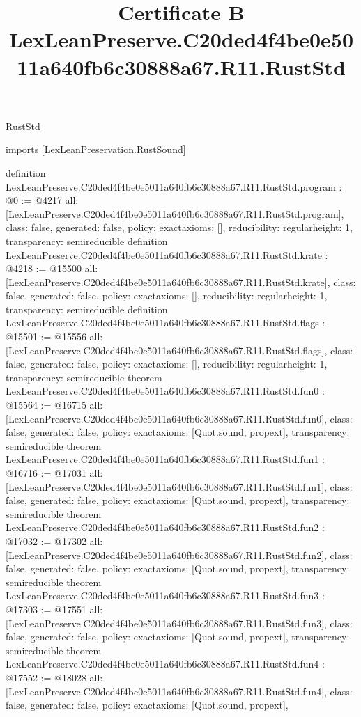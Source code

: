 \begin{lexlean}{RustStd}
\title{Certificate B LexLeanPreserve.C20ded4f4be0e5011a640fb6c30888a67.R11.RustStd}
\begin{coremodule}
imports [LexLeanPreservation.RustSound]

definition LexLeanPreserve.C20ded4f4be0e5011a640fb6c30888a67.R11.RustStd.program : @0 := @4217 {
  all: [LexLeanPreserve.C20ded4f4be0e5011a640fb6c30888a67.R11.RustStd.program],
  class: false,
  generated: false,
  policy: exact{axioms: []},
  reducibility: regular{height: 1},
  transparency: semireducible
}
definition LexLeanPreserve.C20ded4f4be0e5011a640fb6c30888a67.R11.RustStd.krate : @4218 := @15500 {
  all: [LexLeanPreserve.C20ded4f4be0e5011a640fb6c30888a67.R11.RustStd.krate],
  class: false,
  generated: false,
  policy: exact{axioms: []},
  reducibility: regular{height: 1},
  transparency: semireducible
}
definition LexLeanPreserve.C20ded4f4be0e5011a640fb6c30888a67.R11.RustStd.flags : @15501 := @15556 {
  all: [LexLeanPreserve.C20ded4f4be0e5011a640fb6c30888a67.R11.RustStd.flags],
  class: false,
  generated: false,
  policy: exact{axioms: []},
  reducibility: regular{height: 1},
  transparency: semireducible
}
theorem LexLeanPreserve.C20ded4f4be0e5011a640fb6c30888a67.R11.RustStd.fun0 : @15564 := @16715 {
  all: [LexLeanPreserve.C20ded4f4be0e5011a640fb6c30888a67.R11.RustStd.fun0],
  class: false,
  generated: false,
  policy: exact{axioms: [Quot.sound, propext]},
  transparency: semireducible
}
theorem LexLeanPreserve.C20ded4f4be0e5011a640fb6c30888a67.R11.RustStd.fun1 : @16716 := @17031 {
  all: [LexLeanPreserve.C20ded4f4be0e5011a640fb6c30888a67.R11.RustStd.fun1],
  class: false,
  generated: false,
  policy: exact{axioms: [Quot.sound, propext]},
  transparency: semireducible
}
theorem LexLeanPreserve.C20ded4f4be0e5011a640fb6c30888a67.R11.RustStd.fun2 : @17032 := @17302 {
  all: [LexLeanPreserve.C20ded4f4be0e5011a640fb6c30888a67.R11.RustStd.fun2],
  class: false,
  generated: false,
  policy: exact{axioms: [Quot.sound, propext]},
  transparency: semireducible
}
theorem LexLeanPreserve.C20ded4f4be0e5011a640fb6c30888a67.R11.RustStd.fun3 : @17303 := @17551 {
  all: [LexLeanPreserve.C20ded4f4be0e5011a640fb6c30888a67.R11.RustStd.fun3],
  class: false,
  generated: false,
  policy: exact{axioms: [Quot.sound, propext]},
  transparency: semireducible
}
theorem LexLeanPreserve.C20ded4f4be0e5011a640fb6c30888a67.R11.RustStd.fun4 : @17552 := @18028 {
  all: [LexLeanPreserve.C20ded4f4be0e5011a640fb6c30888a67.R11.RustStd.fun4],
  class: false,
  generated: false,
  policy: exact{axioms: [Quot.sound, propext]},
}
\end{coremodule}
\end{lexlean}
